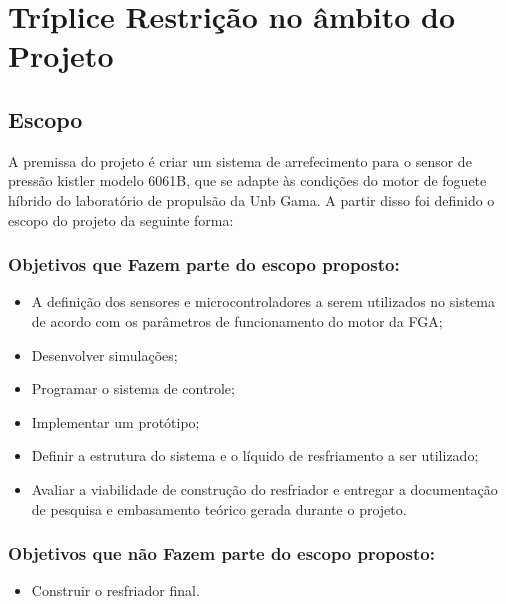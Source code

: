\chapter{Tríplice Restrição no âmbito do Projeto}

\section{Escopo}

A premissa do projeto é criar um sistema de arrefecimento para o sensor de pressão kistler modelo 6061B, que se adapte às condições do motor de foguete híbrido do laboratório de propulsão da Unb Gama. A partir disso foi definido o escopo do projeto da seguinte forma:

\subsection{Objetivos que Fazem parte do escopo proposto:}

\begin{itemize}

	\item A definição dos sensores e microcontroladores a serem utilizados no sistema de acordo com os parâmetros de funcionamento do motor da FGA;

	\item Desenvolver simulações;

	\item Programar o sistema de controle;

	\item Implementar um protótipo;

	\item Definir a estrutura do sistema e o líquido de resfriamento a ser utilizado;

	\item Avaliar a viabilidade de construção do resfriador e entregar a documentação de pesquisa e embasamento teórico gerada durante o projeto.

\end{itemize} 

\subsection{Objetivos que não Fazem parte do escopo proposto:}

\begin{itemize}

	\item Construir o resfriador final.

\end{itemize}

